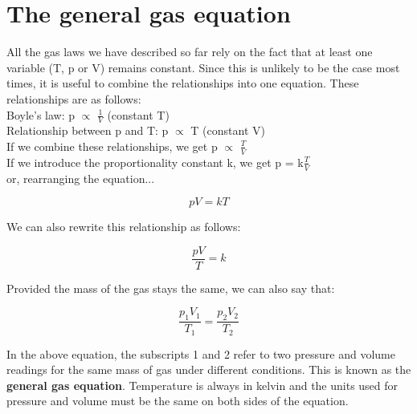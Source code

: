 



\section{The general gas equation}
\label{sec:gases:general equation}

All the gas laws we have described so far rely on the fact that at least one variable (T, p or V) remains constant. Since this is unlikely to be the case most times, it is useful to combine the relationships into one equation. These relationships are as follows:\\

Boyle's law: p $\propto$ $\frac{1}{V}$ (constant T)\\

Relationship between p and T: p $\propto$ T (constant V)\\

If we combine these relationships, we get p $\propto$ $\frac{T}{V}$\\

If we introduce the proportionality constant k, we get p = k$\frac{T}{V}$\\

or, rearranging the equation...

\begin{equation*}
pV = kT
\end{equation*}

We can also rewrite this relationship as follows:

\begin{equation*}
\frac{pV}{T} = k
\end{equation*}

Provided the mass of the gas stays the same, we can also say that:

\begin{equation*}
\frac{p_{1}V_{1}}{T_{1}} = \frac{p_{2}V_{2}}{T_{2}}
\end{equation*}

In the above equation, the subscripts 1 and 2 refer to two pressure and volume readings for the same mass of gas under different conditions. This is known as the \textbf{general gas equation}. Temperature is always in kelvin and the units used for pressure and volume must be the same on both sides of the equation.


